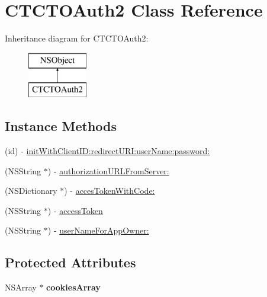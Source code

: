\hypertarget{interface_c_t_c_t_o_auth2}{\section{C\-T\-C\-T\-O\-Auth2 Class Reference}
\label{interface_c_t_c_t_o_auth2}
}
Inheritance diagram for C\-T\-C\-T\-O\-Auth2\-:\begin{figure}[H]
\begin{center}
\leavevmode
\includegraphics[height=2.000000cm]{interface_c_t_c_t_o_auth2}
\end{center}
\end{figure}
\subsection*{Instance Methods}
\begin{DoxyCompactItemize}
\item 
(id) -\/ \hyperlink{interface_c_t_c_t_o_auth2_a1a64c838f79fef55b95e8188231a7170}{init\-With\-Client\-I\-D\-:redirect\-U\-R\-I\-:user\-Name\-:password\-:}
\item 
(N\-S\-String $\ast$) -\/ \hyperlink{interface_c_t_c_t_o_auth2_a864691177dd38e1133e6886f49cc34a8}{authorization\-U\-R\-L\-From\-Server\-:}
\item 
(N\-S\-Dictionary $\ast$) -\/ \hyperlink{interface_c_t_c_t_o_auth2_aaa02738a263ad8efd776e3f340fa9edf}{acces\-Token\-With\-Code\-:}
\item 
(N\-S\-String $\ast$) -\/ \hyperlink{interface_c_t_c_t_o_auth2_a9c60aebf316abf0cefb44b5c2ce5379b}{access\-Token}
\item 
(N\-S\-String $\ast$) -\/ \hyperlink{interface_c_t_c_t_o_auth2_ae3cefb0d226f2d440566735db3ae0fa4}{user\-Name\-For\-App\-Owner\-:}
\end{DoxyCompactItemize}
\subsection*{Protected Attributes}
\begin{DoxyCompactItemize}
\item 
\hypertarget{interface_c_t_c_t_o_auth2_a756424e92592c2e597cae4abf66a5dbf}{N\-S\-Array $\ast$ {\bfseries cookies\-Array}}\label{interface_c_t_c_t_o_auth2_a756424e92592c2e597cae4abf66a5dbf}

\end{DoxyCompactItemize}
